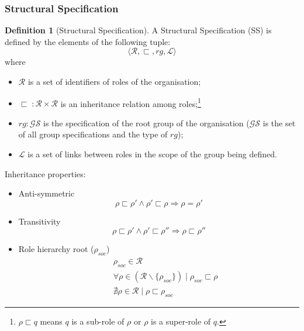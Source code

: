 \documentclass{article}
\newcommand{\st}{\mid}
\newcommand{\set}[1]{\mathcal{#1}}
\newcommand{\subrole}{\sqsubset}
\theoremstyle{definition} \newtheorem{definition}{Definition}
\begin{document}
\subsubsection{Structural Specification}


\begin{definition}[Structural Specification]
  A Structural Specification (SS) is defined by the
  elements of the following tuple:
  \begin{displaymath}
    \langle \set{R}, \sqsubset, rg, \set{L} \rangle    
  \end{displaymath}
  where 
  \begin{itemize}
  \item $\set{R}$ is a set of identifiers of roles of the organisation;
  \item $\sqsubset \; : \set{R} \times \set{R}$ is an inheritance
    relation among roles;\footnote{$\rho \subrole q$ means $q$ is a
      sub-role of $\rho$ or $\rho$ is a super-role of $q$.}
  \item $rg : \set{GS}$ is the specification of the root group of
    the organisation ($\set{GS}$ is the set of all group
    specifications and the type of $rg$);
  \item $\set{L}$ is a set of links between roles in the scope of
    the group being defined.
  \end{itemize}
Inheritance properties:
\begin{itemize}
\item Anti-symmetric
  \begin{equation}
  \rho \subrole \rho' \land \rho' \subrole \rho   \Rightarrow \rho = \rho'
 \end{equation}

\item Transitivity 
  \begin{equation}
    \rho \subrole \rho' \land \rho' \subrole \rho'' \Rightarrow \rho \subrole \rho''
  \end{equation}
  
\item Role hierarchy root ($\rho_{soc}$)
  \begin{eqnarray}
    &&\rho_{soc} \in \mathcal{R}\\
    &&\forall \rho \in (\mathcal{R} \backslash \{\rho_{soc}\}) \st {\rho_{soc} \subrole \rho}\\
    &&\nexists \rho \in \mathcal{R} \st \rho \subrole \rho_{soc}
  \end{eqnarray}

\end{itemize}
\end{definition}
\end{document}
